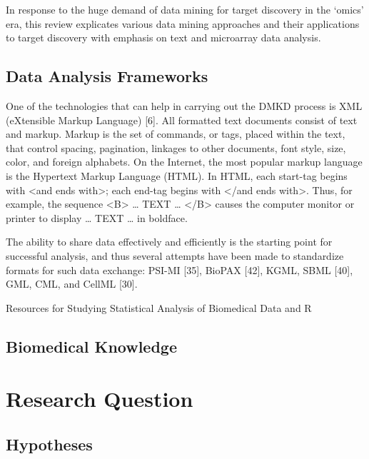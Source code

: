\documentclass[10pt,a4paper]{article}
\begin{document}
	In response to the huge demand of data mining for target discovery in the ‘omics’ era, this review explicates various data mining approaches and their applications to target discovery with emphasis on text and microarray data analysis. \cite{YANG2012S16}
	
	\subsection{Data Analysis Frameworks}
	
	One of the technologies that can help in carrying out the DMKD process is XML (eXtensible Markup Language) [6]. All formatted text documents consist of text and markup. Markup is the set of commands, or tags, placed within the text, that control spacing, pagination, linkages to other documents, font style, size, color, and foreign alphabets. On the Internet, the most popular markup language is the Hypertext Markup Language (HTML). In HTML, each start-tag begins with <and ends with>; each end-tag begins with </and ends with>. Thus, for example, the sequence <B> … TEXT … </B> causes the computer monitor or printer to display … TEXT … in boldface. \cite{CIOS20021}
	
	The ability to share data effectively and efficiently is the starting point for successful
	analysis, and thus several attempts have been made to standardize formats for such
	data exchange: PSI-MI [35], BioPAX [42], KGML, SBML [40], GML, CML, and
	CellML [30]. \cite{Otasek2014}
	
	Resources for Studying Statistical Analysis
	of Biomedical Data and R \cite{Kobayashi2014}
	
	\subsection{Biomedical Knowledge}
	
	\section{Research Question}
	
	\subsection{Hypotheses}
	
	 
	
	
\end{document}
